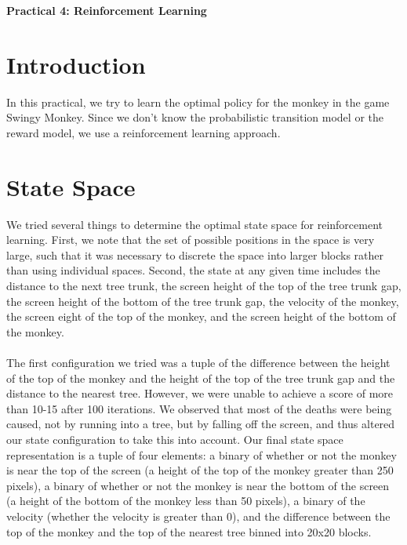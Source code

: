 \documentclass[10pt, oneside]{article}
\begin{document}
\centerline{\Large{\textbf{Practical 4: Reinforcement Learning}}}
\vspace{6px}
\section{Introduction}
In this practical, we try to learn the optimal policy for the monkey in the game Swingy Monkey. Since we don't know the probabilistic transition model or the reward model, we use a reinforcement learning approach. 
\section{State Space}
We tried several things to determine the optimal state space for reinforcement learning. First, we note that the set of possible positions in the space is very large, such that it was necessary to discrete the space into larger blocks rather than using individual spaces. Second, the state at any given time includes the distance to the next tree trunk, the screen height of the top of the tree trunk gap, the screen height of the bottom of the tree trunk gap, the velocity of the monkey, the screen eight of the top of the monkey, and the screen height of the bottom of the monkey. \\\\
The first configuration we tried was a tuple of the difference between the height of the top of the monkey and the height of the top of the tree trunk gap and the distance to the nearest tree. However, we were unable to achieve a score of more than 10-15 after 100 iterations. We observed that most of the deaths were being caused, not by running into a tree, but by falling off the screen, and thus altered our state configuration to take this into account. Our final state space representation is a tuple of four elements: a binary of whether or not the monkey is near the top of the screen (a height of the top of the monkey greater than 250 pixels), a binary of whether or not the monkey is near the bottom of the screen (a height of the bottom of the monkey less than 50 pixels), a binary of the velocity (whether the velocity is greater than 0), and the difference between the top of the monkey and the top of the nearest tree binned into 20x20 blocks. 
\end{document}
